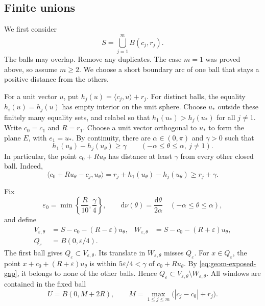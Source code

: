 \documentclass[12pt,reqno,tbtags]{amsart}
\def\d{\mathrm{d}}
\newcommand\inpro[2]{\langle #1,#2\rangle}
\newcommand\1{\mathbbm{1}}
\newcommand{\eps}{\varepsilon}
\def\d{\mathrm{d}}
\begin{document}
\subsection{Finite unions}

We first consider
\begin{equation*}
    S=\bigcup_{j=1}^{m}B(c_j,r_j).
\end{equation*}
The balls may overlap. Remove any duplicates.
The case $m=1$ was proved above, so assume $m\ge2$.
We choose a short boundary arc of one ball that stays a positive distance
from the others.

For a unit vector $u$, put $h_j(u)=\inpro{c_j}{u}+r_j$.
For distinct balls, the equality $h_i(u)=h_j(u)$ has empty interior on the
unit sphere. Choose $u_*$ outside these finitely many equality sets, and
relabel so that $h_1(u_*)>h_j(u_*)$ for all $j\ne1$.
Write $c_0=c_1$ and $R=r_1$. Choose a unit vector orthogonal to $u_*$ to form
the plane $E$, with $e_1=u_*$. By continuity, there are $\alpha\in(0,\pi)$
and $\gamma>0$ such that
\begin{equation}\label{eq:geom-exposed-gap}
    h_1(u_\theta)-h_j(u_\theta)\ge\gamma
    \qquad(-\alpha\le\theta\le\alpha,\ j\ne1).
\end{equation}
In particular, the point $c_0+Ru_\theta$ has distance at least $\gamma$
from every other closed ball. Indeed,
\begin{equation*}
    \inpro{c_0+Ru_\theta-c_j}{u_\theta}
    =r_j+h_1(u_\theta)-h_j(u_\theta)\ge r_j+\gamma.
\end{equation*}

Fix
\begin{equation*}
    \eps_0=\min\left\{\frac R{10},\frac\gamma4\right\},
    \qquad \d\nu(\theta)=\frac{\d\theta}{2\alpha}
    \quad(-\alpha\le\theta\le\alpha),
\end{equation*}
and define
\begin{equation}\label{eq:geom-union-windows}
    \begin{aligned}
        V_{\eps,\theta}&=S-c_0-(R-\eps)u_\theta,
        &W_{\eps,\theta}&=S-c_0-(R+\eps)u_\theta,\\
        Q_\eps&=B(0,\eps/4).
    \end{aligned}
\end{equation}
The first ball gives $Q_\eps\subset V_{\eps,\theta}$.
Its translate in $W_{\eps,\theta}$ misses $Q_\eps$.
For $x\in Q_\eps$, the point $x+c_0+(R+\eps)u_\theta$ is within
$5\eps/4<\gamma$ of $c_0+Ru_\theta$. By \eqref{eq:geom-exposed-gap},
it belongs to none of the other balls. Hence
$Q_\eps\subset V_{\eps,\theta}\setminus W_{\eps,\theta}$.
All windows are contained in the fixed ball
\begin{equation*}
    U=B(0,M+2R),\qquad
    M=\max_{1\le j\le m}\bigl(|c_j-c_0|+r_j\bigr).
\end{equation*}
\end{document}
